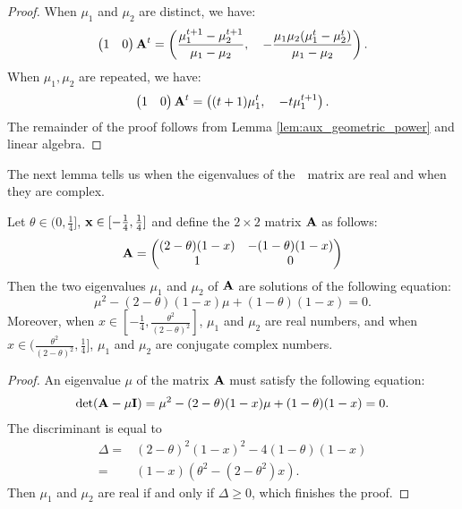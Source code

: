 \begin{proof}
When $\mu_1$ and $\mu_2$ are distinct, we have:
\begin{equation*}
\begin{pmatrix} 1 & 0  \end{pmatrix} \mathbf{A}^t =
\left(\frac{\mu_1^{t+1} - \mu_2^{t+1}}{\mu_1 - \mu_2}, \quad - \frac{\mu_1\mu_2(\mu_1^t - \mu_2^t)}{\mu_1 - \mu_2}\right).
\end{equation*}
When $\mu_1, \mu_2$ are repeated, we have:
\begin{equation*}
\begin{pmatrix} 1 & 0  \end{pmatrix} \mathbf{A}^t =
\left((t+1)\mu_1^t, \quad -t \mu_1^{t+1}\right).
\end{equation*}
The remainder of the proof follows from Lemma \ref{lem:aux_geometric_power} 
and linear algebra.
\end{proof}

\noindent
The next lemma tells us when the eigenvalues of the~\nag~matrix are real and when they are complex.
\begin{lemma}\label{lem:aux_eigenvalues}
Let $\theta \in (0, \frac{1}{4}]$, $\mathbf{x} \in [-\frac{1}{4}, \frac{1}{4}]$ and
define the $2\times 2$ matrix $\mathbf{A}$ as follows:
\begin{equation*}
\mathbf{A} = \begin{pmatrix} (2-\theta) (1 - x)&  -(1-\theta) (1 - x) \\ 1 & 0 \end{pmatrix}
\end{equation*}
Then the two eigenvalues $\mu_1$ and $\mu_2$ of $\mathbf{A}$ are solutions of the
following equation:
\begin{equation*}
\mu^2 - (2-\theta)(1-x)\mu + (1-\theta)(1-x) = 0.
\end{equation*}
Moreover, when $x \in [-\frac{1}{4}, \frac{\theta^2}{(2-\theta)^2}]$, 
$\mu_1$ and $\mu_2$ are real numbers, and when
$x \in (\frac{\theta^2}{(2-\theta)^2}, \frac{1}{4}]$, 
$\mu_1$ and $\mu_2$ are conjugate complex numbers.
\end{lemma}

\begin{proof}
An eigenvalue $\mu$ of the matrix $\mathbf{A}$ must satisfy the following equation:
\begin{align*}
\text{det} (\mathbf{A} - \mu \mathbf{I}) = \mu^2 - (2-\theta)(1-x)\mu + (1-\theta)(1-x) = 0.
\end{align*}
The discriminant is equal to
\begin{align*}
\Delta = &(2-\theta)^2(1-x)^2 - 4(1-\theta)(1-x) \\
= &(1-x)(\theta^2 - (2-\theta^2)x).
\end{align*}
Then $\mu_1$ and $\mu_2$ are real if and only if $\Delta \ge 0$, 
which finishes the proof.
\end{proof}

